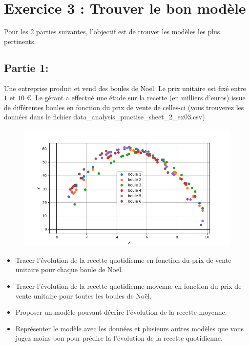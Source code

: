 \documentclass[11pt, french]{article}
\begin{document}
\section*{Exercice 3 : Trouver le bon modèle}
Pour les 2 parties suivantes, l'objectif est de trouver les modèles les plus pertinents.

\subsection*{Partie 1:}
Une entreprise produit et vend des boules de Noël. Le prix unitaire est fixé entre $1$ et $10$ €. Le gérant a effectué une étude sur la recette (en milliers d'euros) issue de différentes boules en fonction du prix de vente de celles-ci (vous trouverez les données dans le fichier data\_analysis\_practise\_sheet\_2\_ex03.csv)

\begin{figure}[!h]
    \center
    \includegraphics[scale=0.7]{assets/serie_2_exo_3_figure_5.png}
    \label{fig:p_s_2_exo3-fig1}
\end{figure}

\begin{itemize}
    \item Tracer l'évolution de la recette quotidienne en fonction du prix de vente unitaire pour chaque boule de Noël.
    \item Tracer l'évolution de la recette quotidienne moyenne en fonction du prix de vente unitaire pour toutes les boules de Noël.
    \item Proposer un modèle pouvant décrire l'évolution de la recette moyenne.
    \item Représenter le modèle avec les données et plusieurs autres modèles que vous jugez moins bon pour prédire la l'évolution de la recette quotidienne.
\end{itemize}
\end{document}
